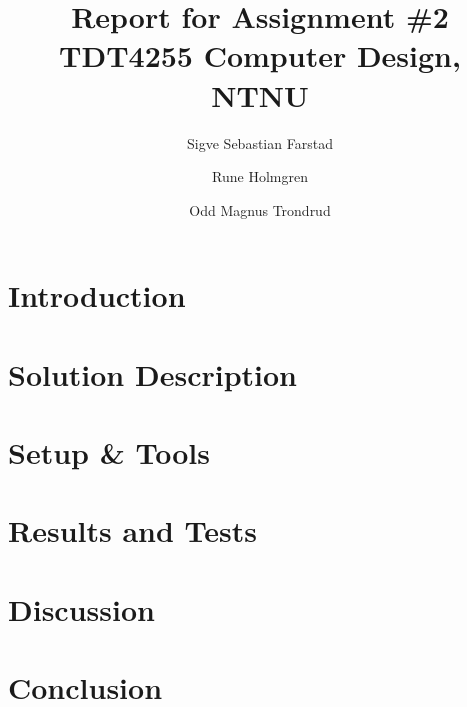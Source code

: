 


\title{Report for Assignment \#2 \\
TDT4255 Computer Design, NTNU}
\author{Sigve Sebastian Farstad \and
		Rune Holmgren \and
		Odd Magnus Trondrud}




\maketitle


\begin{abstract}
	
\end{abstract}

\tableofcontents

\listoffigures

\listoftables


\chapter{Introduction}


	

\chapter{Solution Description}
	

\chapter{Setup \& Tools}
	

\chapter{Results and Tests}
	

\chapter{Discussion}
	

\chapter{Conclusion}
	



{}

\nocite{*} %



